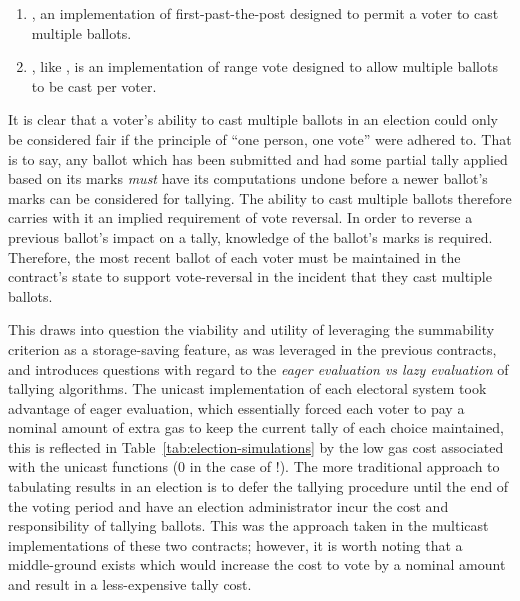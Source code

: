 \begin{enumerate}
  \item {}, an implementation of first-past-the-post designed
    to permit a voter to cast multiple ballots.


  \item {}, like , is an
    implementation of range vote designed to allow multiple ballots to be cast
    per voter.

\end{enumerate}

It is clear that a voter's ability to cast multiple ballots in an election could
only be considered fair if the principle of ``one person, one vote'' were
adhered to. That is to say, any ballot which has been submitted and had some
partial tally applied based on its marks \emph{must} have its computations
undone before a newer ballot's marks can be considered for tallying. The ability
to cast multiple ballots therefore carries with it an implied requirement of
vote reversal. In order to reverse a previous ballot's impact on a tally,
knowledge of the ballot's marks is required. Therefore, the most recent ballot
of each voter must be maintained in the contract's state to support
vote-reversal in the incident that they cast multiple ballots.

This draws into question the viability and utility of leveraging the summability
criterion as a storage-saving feature, as was leveraged in the previous
contracts, and introduces questions with regard to the \emph{eager evaluation vs
lazy evaluation} of tallying algorithms. The unicast implementation of each
electoral system took advantage of eager evaluation, which essentially forced
each voter to pay a nominal amount of extra gas to keep the current tally of
each choice maintained, this is reflected in
Table~\ref{tab:election-simulations} by the low gas cost associated with the
unicast  functions (0 in the case of !).
The more traditional approach to tabulating results in an election is to defer
the tallying procedure until the end of the voting period and have an election
administrator incur the cost and responsibility of tallying ballots. This was
the approach taken in the multicast implementations of these two contracts;
however, it is worth noting that a middle-ground exists which would increase the
cost to vote by a nominal amount and result in a less-expensive tally cost.

